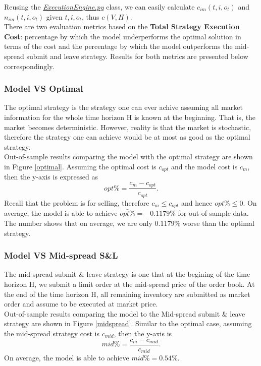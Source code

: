\documentclass[12pt]{extarticle}
\begin{document}
\noindent Reusing the \href{https://github.com/wangkunzhen/Machine-Learning-5225/blob/master/Model.py}{\textit{ExecutionEngine.py}} class, we can easily calculate
$c_{im}(t, i, o_t)$ and $n_{im}(t, i, o_t)$ given $t, i, o_t$, thus $c(V, H)$.\\


\noindent There are two evaluation metrics based on the \textbf{Total Strategy Execution Cost}:
percentage by which the model underperforms the optimal solution in terms of the cost and the
percentage by which the model outperforms the mid-spread submit and leave strategy.
Results for both metrics are presented below correspondingly.

\subsubsection{Model VS Optimal}
The optimal strategy is the strategy one can ever achive assuming all market information for the whole
time horizon H is known at the beginning. That is, the market becomes deterministic.
However, reality is that the market is stochastic, therefore the strategy one can
achieve would be at most as good as the optimal strategy.\\


\noindent Out-of-sample results comparing the model with the optimal strategy are shown in Figure \ref{optimal}.
Assuming the optimal cost is $c_{opt}$ and the model cost is $c_{m}$, then the y-axis
is expressed as $$opt\% = \frac{c_{m} - c_{opt}}{c_{opt}}.$$
Recall that the problem is for selling, therefore $c_{m} \le c_{opt}$ and hence $opt\% \le 0$.
On average, the model is able to achieve $\bar{opt\%} = -0.1179\%$ for out-of-sample data.
The number shows that on average, we are only $0.1179\%$ worse than the optimal strategy.

\subsubsection{Model VS Mid-spread S\&L}

The mid-spread submit \& leave strategy is one that at the begining of the time
horizon H, we submit a limit order at the mid-spread price of the order book.
At the end of the time horizon H, all remaining inventory are submitted as market
order and assume to be executed at market price.\\


\noindent Out-of-sample results comparing the model to the Mid-spread submit \& leave strategy are shown
in Figure \ref{midspread}. Similar to the optimal case, assuming the mid-spread strategy
cost is $c_{mid}$, then the y-axis is $$mid\% = \frac{c_{m} - c_{mid}}{c_{mid}}.$$
On average, the model is able to achieve $mid\% = 0.54\%$.\\
\end{document}

